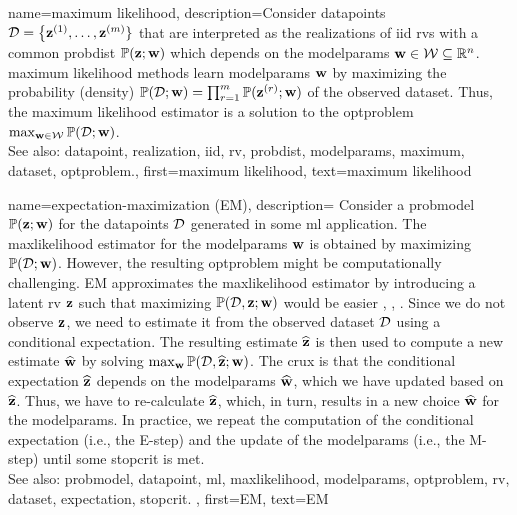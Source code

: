 {name={maximum likelihood}, 
	description={Consider \glspl{datapoint} $\mathcal{D}=\big\{ {\bf z}^{(1)}, \ldots, {\bf z}^{(m)} \}$ 
		that are interpreted as the \glspl{realization} of \gls{iid} \glspl{rv} with a common \gls{probdist} $\mathbb{P}({{\bf z}; {\bf w}})$ which 
		depends on the \gls{modelparams} ${\bf w} \in \mathcal{W} \subseteq \mathbb{R}^{n}$. 
		\Gls{maximum} likelihood methods learn \gls{modelparams} ${\bf w}$ by maximizing 
		the probability (density) $\mathbb{P}({\mathcal{D}; {\bf w}}) = \prod_{r=1}^{m} \mathbb{P}({{\bf z}^{(r)}; {\bf w}})$ 
		of the observed \gls{dataset}. Thus, the \gls{maximum} likelihood estimator is a 
		solution to the \gls{optproblem} $\max_{{\bf w} \in \mathcal{W}} \mathbb{P}({\mathcal{D}; {\bf w}})$.
				\\
		See also: \gls{datapoint}, \gls{realization}, \gls{iid}, \gls{rv}, \gls{probdist}, \gls{modelparams}, \gls{maximum}, \gls{dataset}, \gls{optproblem}.},
	first={maximum likelihood},
	text={maximum likelihood}
}


{name={expectation-maximization (EM)}, 
	description={ 
		Consider a \gls{probmodel} $\mathbb{P}({{\bf z}; {\bf w}})$ for the \glspl{datapoint} $\mathcal{D}$ generated in some 
		\gls{ml} application. The \gls{maxlikelihood} estimator for the \gls{modelparams} ${\bf w}$ is obtained by maximizing 
		$\mathbb{P}({\mathcal{D}; {\bf w}})$. However, the resulting \gls{optproblem} might be computationally 
		challenging. EM approximates the \gls{maxlikelihood} estimator by introducing a latent 
		\gls{rv} ${\bf z}$ such that maximizing $\mathbb{P}({\mathcal{D},{\bf z}; {\bf w}})$ would be easier \cite{hastie01statisticallearning}, \cite{BishopBook}, \cite{GraphModExpFamVarInfWainJor}. Since we 
		do not observe ${\bf z}$, we need to estimate it from the observed \gls{dataset} $\mathcal{D}$ 
		using a conditional \gls{expectation}. The resulting estimate $\widehat{{\bf z}}$ is then used to 
		compute a new estimate $\widehat{{\bf w}}$ by solving $\max_{{\bf w}} \mathbb{P}({\mathcal{D}, \widehat{{\bf z}}; {\bf w}})$. 
		The crux is that the conditional \gls{expectation} $\widehat{{\bf z}}$ depends on the \gls{modelparams} $\widehat{{\bf w}}$, 
		which we have updated based on $\widehat{{\bf z}}$. Thus, we have to re-calculate $\widehat{{\bf z}}$, 
		which, in turn, results in a new choice $\widehat{{\bf w}}$ for the \gls{modelparams}. In practice, 
		we repeat the computation of the conditional \gls{expectation} (i.e., the E-step) and the update 
		of the \gls{modelparams} (i.e., the M-step) until some \gls{stopcrit} is met. 
				\\
		See also: \gls{probmodel}, \gls{datapoint}, \gls{ml}, \gls{maxlikelihood}, \gls{modelparams}, \gls{optproblem}, \gls{rv}, \gls{dataset}, \gls{expectation}, \gls{stopcrit}. },
	first={EM},
	text={EM}
}


